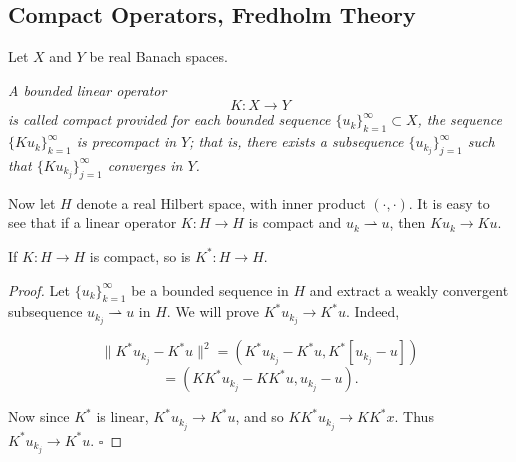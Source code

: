 \subsection{Compact Operators, Fredholm Theory}
\label{sec:compact-operators-fredholm-theory}

Let $X$ and $Y$ be real Banach spaces.

\begin{definition}
\label{def:compact-linear-operator}
\textit{A bounded linear operator}
$$K : X \to Y$$
\textit{is called compact provided for each bounded sequence $\{u_k\}_{k=1}^\infty \subset X$, the sequence $\{Ku_k\}_{k=1}^\infty$ is precompact in $Y$; that is, there exists a subsequence $\{u_{k_j}\}_{j=1}^\infty$ such that $\{Ku_{k_j}\}_{j=1}^\infty$ converges in $Y$.}
\end{definition}

\begin{remark}
\label{rem:compact-operator-weak-to-strong-convergence}
Now let $H$ denote a real Hilbert space, with inner product $(\cdot, \cdot)$. It is easy to see that if a linear operator $K : H \to H$ is compact and $u_k \rightharpoonup u$, then $Ku_k \to Ku$.
\end{remark}

\begin{theorem}
\label{thm:compactness-of-adjoint-operator}
If $K : H \to H$ is compact, so is $K^* : H \to H$.
\end{theorem}

\begin{proof}
Let $\{u_k\}_{k=1}^\infty$ be a bounded sequence in $H$ and extract a weakly convergent subsequence $u_{k_j} \rightharpoonup u$ in $H$. We will prove $K^*u_{k_j} \to K^*u$. Indeed,

$$\|K^*u_{k_j} - K^*u\|^2 = (K^*u_{k_j} - K^*u, K^*[u_{k_j} - u])$$
$$= (KK^*u_{k_j} - KK^*u, u_{k_j} - u).$$

Now since $K^*$ is linear, $K^*u_{k_j} \to K^*u$, and so $KK^*u_{k_j} \to KK^*x$. Thus $K^*u_{k_j} \to K^*u$. $\square$
\end{proof}

